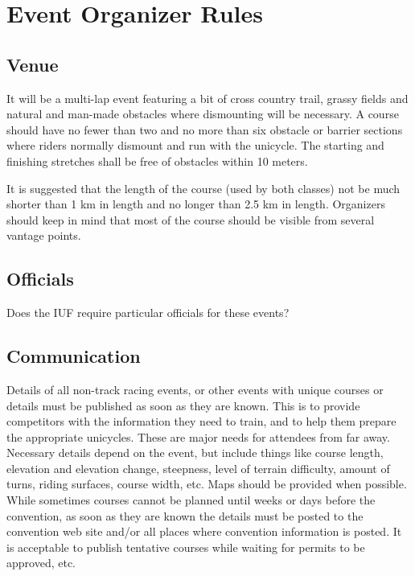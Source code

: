 \chapter{Event Organizer Rules}

\section{Venue}

It will be a multi-lap event featuring a bit of cross country trail, grassy fields and natural and man-made obstacles where dismounting will be necessary.
A course should have no fewer than two and no more than six obstacle or barrier sections where riders normally dismount and run with the unicycle.
The starting and finishing stretches shall be free of obstacles within 10 meters.

It is suggested that the length of the course (used by both classes) not be much shorter than 1 km in length and no longer than 2.5 km in length. 
Organizers should keep in mind that most of the course should be visible from several vantage points.

\section{Officials}

\begin{framed}
Does the IUF require particular officials for these events?
\end{framed}

\section{Communication}

\begin{framed}
Some thoughts on what might need to be communicated:
\begin{itemize}
\item age groups
\item results
\end{itemize}
}
\end{framed}

Details of all non-track racing events, or other events with unique courses or details must be published as soon as they are known. 
This is to provide competitors with the information they need to train, and to help them prepare the appropriate unicycles.
These are major needs for attendees from far away. 
Necessary details depend on the event, but include things like course length, elevation and elevation change, steepness, level of terrain difficulty, amount of turns, riding surfaces, course width, etc.
Maps should be provided when possible. 
While sometimes courses cannot be planned until weeks or days before the convention, as soon as they are known the details must be posted to the convention web site and/or all places where convention information is posted. 
It is acceptable to publish tentative courses while waiting for permits to be approved, etc.

